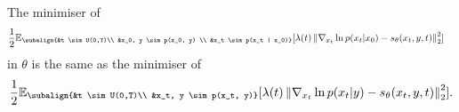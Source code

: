\begin{customthm}{1}
    The minimiser of
    \begin{gather*}
    \begin{aligned}
            &\frac{1}{2} \mathbb{E}_{\subalign{&t \sim U(0,T)\\ &x_0, y \sim p(x_0, y) \\ &x_t \sim p(x_t | x_0)}} 
            [\lambda(t) \norm{\nabla_{x_t} \ln{p(x_t | x_0)} - s_\theta(x_t, y, t)}_2^2]
    \end{aligned}
    \end{gather*}    
    in $\theta$ is the same as the minimiser of 
    \begin{gather*}
         \frac{1}{2} \mathbb{E}_{\subalign{&t \sim U(0,T)\\ &x_t, y \sim p(x_t, y)}} 
        [\lambda(t) \norm{\nabla_{x_t} \ln{p(x_t | y)} - s_\theta(x_t, y,t)}_2^2].
    \end{gather*}
\end{customthm}

